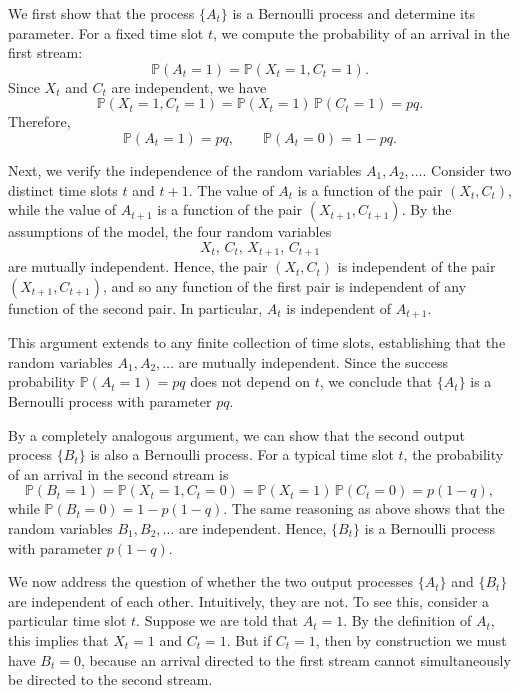 We first show that the process \(\{A_t\}\) is a Bernoulli process and determine its parameter.  
For a fixed time slot \(t\), we compute the probability of an arrival in the first stream:
\[
\mathbb{P}(A_t = 1)
=
\mathbb{P}(X_t = 1, C_t = 1).
\]
Since \(X_t\) and \(C_t\) are independent, we have
\[
\mathbb{P}(X_t = 1, C_t = 1)
=
\mathbb{P}(X_t = 1)\,\mathbb{P}(C_t = 1)
=
p q.
\]
Therefore,
\[
\mathbb{P}(A_t = 1) = p q,
\qquad
\mathbb{P}(A_t = 0) = 1 - p q.
\]

Next, we verify the independence of the random variables \(A_1, A_2, \ldots\).  
Consider two distinct time slots \(t\) and \(t+1\).  
The value of \(A_t\) is a function of the pair \((X_t, C_t)\), while the value of \(A_{t+1}\) is a function of the pair \((X_{t+1}, C_{t+1})\).  
By the assumptions of the model, the four random variables
\[
X_t, \, C_t, \, X_{t+1}, \, C_{t+1}
\]
are mutually independent.  
Hence, the pair \((X_t, C_t)\) is independent of the pair \((X_{t+1}, C_{t+1})\), and so any function of the first pair is independent of any function of the second pair.  
In particular, \(A_t\) is independent of \(A_{t+1}\).  

This argument extends to any finite collection of time slots, establishing that the random variables \(A_1, A_2, \ldots\) are mutually independent.  
Since the success probability \(\mathbb{P}(A_t = 1) = p q\) does not depend on \(t\), we conclude that \(\{A_t\}\) is a Bernoulli process with parameter \(p q\).  

By a completely analogous argument, we can show that the second output process \(\{B_t\}\) is also a Bernoulli process.  
For a typical time slot \(t\), the probability of an arrival in the second stream is
\[
\mathbb{P}(B_t = 1)
=
\mathbb{P}(X_t = 1, C_t = 0)
=
\mathbb{P}(X_t = 1)\,\mathbb{P}(C_t = 0)
=
p (1 - q),
\]
while \(\mathbb{P}(B_t = 0) = 1 - p (1-q)\).  
The same reasoning as above shows that the random variables \(B_1, B_2, \ldots\) are independent.  
Hence, \(\{B_t\}\) is a Bernoulli process with parameter \(p (1 - q)\).  

We now address the question of whether the two output processes \(\{A_t\}\) and \(\{B_t\}\) are independent of each other.  
Intuitively, they are not.  
To see this, consider a particular time slot \(t\).  
Suppose we are told that \(A_t = 1\).  
By the definition of \(A_t\), this implies that \(X_t = 1\) and \(C_t = 1\).  
But if \(C_t = 1\), then by construction we must have \(B_t = 0\), because an arrival directed to the first stream cannot simultaneously be directed to the second stream.  

